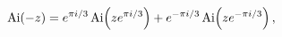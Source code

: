 \[\mathop{\mathrm{Ai}\/}\nolimits\!\left(-z\right)=e^{\pi i/3}\mathop{\mathrm{Ai%
}\/}\nolimits\!\left(ze^{\pi i/3}\right)+e^{-\pi i/3}\mathop{\mathrm{Ai}\/}%
\nolimits\!\left(ze^{-\pi i/3}\right),\]